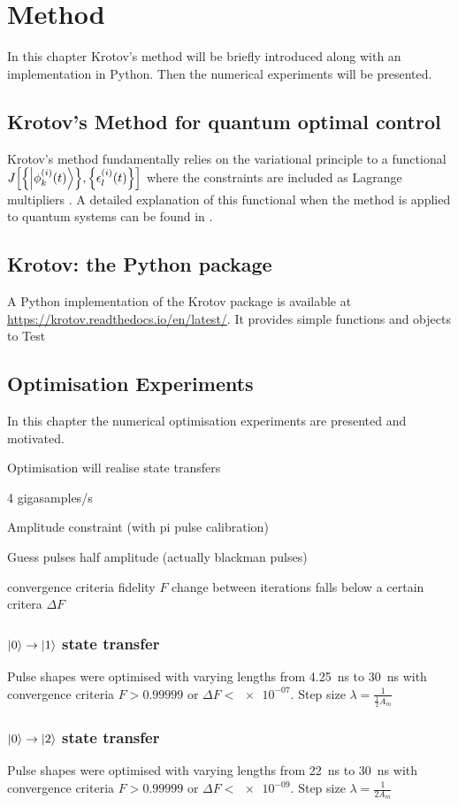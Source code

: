 \documentclass[main.tex]{subfiles}
\begin{document}
\chapter{Method}
In this chapter Krotov's method will be briefly introduced along with an implementation in Python. Then the numerical experiments will be presented.



\section{Krotov's Method for quantum optimal control}
Krotov's method fundamentally relies on the variational principle to \minimize{} a functional \(J\qty[\qty{\ket{\phi^{(i)}_k(t)}},\qty{\epsilon_l^{(i)}(t)}]\) where the constraints are included as Lagrange multipliers \cite{goerz_krotov:_2019}. A detailed explanation of this functional when the method is applied to quantum systems can be found in \cite{reich_monotonically_2012}. 

\section{Krotov: the Python package}
A Python implementation of the Krotov package is available at \url{https://krotov.readthedocs.io/en/latest/}. It provides simple functions and objects to
Test

\section{Optimisation Experiments}
In this chapter the numerical optimisation experiments are presented and motivated.

Optimisation will realise state transfers

4 gigasamples/s

Amplitude constraint (with pi pulse calibration)

Guess pulses half amplitude (actually blackman pulses)

convergence criteria
fidelity \(F\)
change between iterations falls below a certain critera \(\Delta F\)

\subsection{\texorpdfstring{\boldmath\(\ket{0}\rightarrow\ket{1}\)}{0 -> 1} state transfer}
Pulse shapes were optimised with varying lengths from \SI{4.25}{\nano\second} to \SI{30}{\nano\second} with convergence criteria \(F>0.99999\) or \(\Delta F < \num{e-07}\). Step size \(\lambda = \frac{1}{\frac{1}{2}A_{m}}\)

\subsection{\texorpdfstring{\boldmath\(\ket{0}\rightarrow\ket{2}\)}{0 -> 2} state transfer}
Pulse shapes were optimised with varying lengths from \SI{22}{\nano\second} to \SI{30}{\nano\second} with convergence criteria \(F>0.99999\) or \(\Delta F < \num{e-09}\). Step size \(\lambda = \frac{1}{2A_{m}}\)
\end{document}
